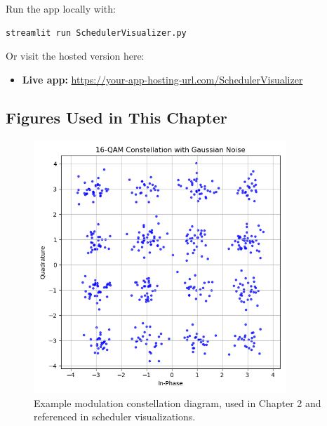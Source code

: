 \noindent Run the app locally with:

\begin{verbatim}
streamlit run SchedulerVisualizer.py
\end{verbatim}

Or visit the hosted version here:

\begin{itemize}
  \item \textbf{Live app:} \url{https://your-app-hosting-url.com/SchedulerVisualizer}
\end{itemize}

\vspace{1em}
\subsection{Figures Used in This Chapter}

\vspace{1em}
\begin{figure}[H]
  \centering
  \includegraphics[width=0.85\textwidth]{./figures/modulation_constellation_example.png}
  \caption{Example modulation constellation diagram, used in Chapter 2 and referenced in scheduler visualizations.}
\end{figure}

\newpage

